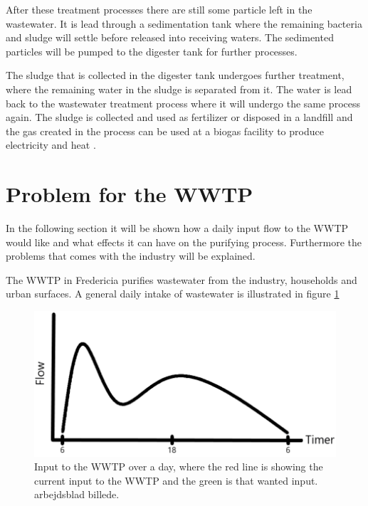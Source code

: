 After these treatment processes there are still some particle left in the wastewater. It is lead through a sedimentation tank where the remaining bacteria and sludge will settle before released into receiving waters. The sedimented particles will be pumped to the digester tank for further processes.


The sludge that is collected in the digester tank undergoes further treatment, where the remaining water in the sludge is separated from it. The water is lead back to the wastewater treatment process where it will undergo the same process again. The sludge is collected and used as fertilizer or disposed in a landfill and the gas created in the process can be used at a biogas facility to produce electricity and heat \cite{wwtp_ekstra}.


\section{Problem for the WWTP}
In the following section it will be shown how a daily input flow to the WWTP would like and what effects it can have on the purifying process. Furthermore the problems that comes with the industry will be explained. 

The WWTP in Fredericia purifies wastewater from the industry, households and urban surfaces. A general daily intake of wastewater is illustrated in figure \ref{fig:input_to_wwtp}  

\begin{figure}[H]
\centering
\includegraphics[width=.6\textwidth]{report/introduction/pictures/input_to_wwtp.png}
\caption{Input to the WWTP over a day, where the red line is showing the current input to the WWTP and the green is that wanted input. arbejdsblad billede. }
\label{fig:input_to_wwtp}%
\end{figure} 

